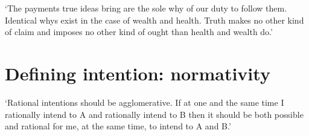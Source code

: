 \documentclass[11pt]{extarticle}
\begin{document}
\begin{multicols}{3}
‘The payments true ideas bring are the sole why of our duty to follow them.  Identical whys exist in the case of wealth and health.  Truth makes no other kind of claim and imposes no other kind of ought than health and wealth do.’\citep{James:1907ae} %

\section{Defining intention: normativity}
`Rational intentions should be agglomerative. If at one and the same time I rationally intend to A and rationally intend to B then it should be both possible and rational for me, at the same time, to intend to A and B.'\citep{bratman_faces_1999} %
 


\footnotesize 


\end{multicols}
\end{document}
